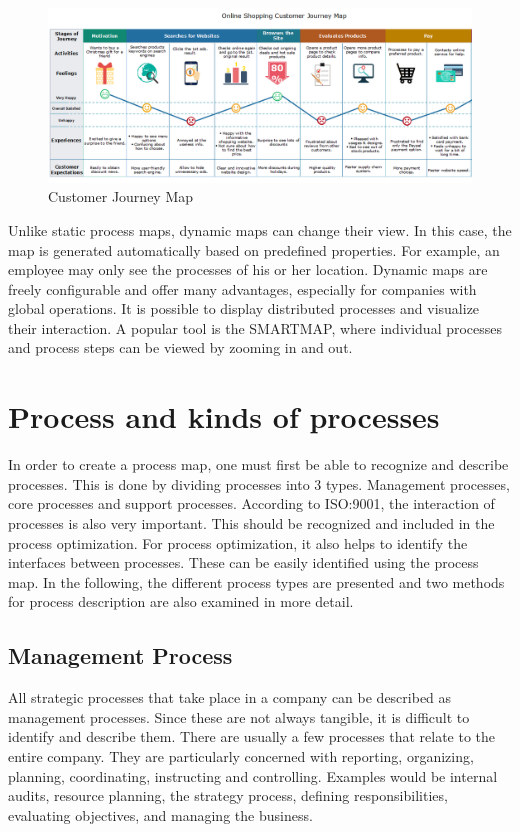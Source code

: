 \documentclass[11pt,a4paper]{article}
\begin{document}
\begin{figure}[h] 
  \centering
     \includegraphics[width=1\textwidth]{online-shopping-customer-journey-map.png}
  \caption{Customer Journey Map \cite{8}}
  \label{customer}
\end{figure}

Unlike static process maps, dynamic maps can change their view. In this case,
the map is generated automatically based on predefined properties. For
example, an employee may only see the processes of his or her location.
Dynamic maps are freely configurable and offer many advantages, especially for
companies with global operations. It is possible to display distributed
processes and visualize their interaction. A popular tool is the SMARTMAP,
where individual processes and process steps can be viewed by zooming in and
out.

\section{Process and kinds of processes}\label{sec:process}

In order to create a process map, one must first be able to recognize and
describe processes. This is done by dividing processes into 3
types. Management processes, core processes and support processes. According
to ISO:9001, the interaction of processes is also very important. This should
be recognized and included in the process optimization. For process
optimization, it also helps to identify the interfaces between processes.
These can be easily identified using the process map. In the following, the
different process types are presented and two methods for process description
are also examined in more detail.

\subsection{Management Process}

All strategic processes that take place in a company can be described as
management processes. Since these are not always tangible, it is difficult to
identify and describe them. There are usually a few processes that relate to
the entire company. They are particularly concerned with reporting,
organizing, planning, coordinating, instructing and controlling. Examples
would be internal audits, resource planning, the strategy process, defining
responsibilities, evaluating objectives, and managing the business.
\end{document}
